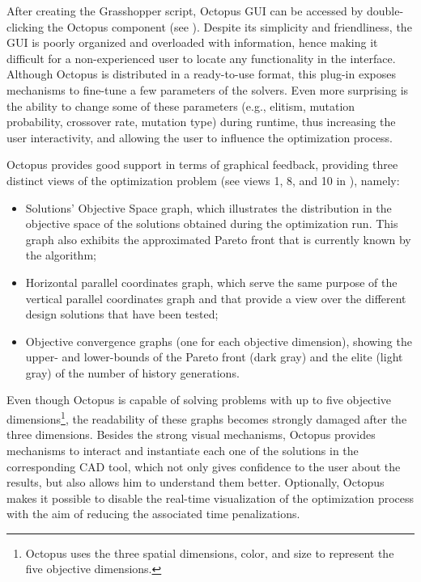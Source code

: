 	After creating the Grasshopper script, Octopus \ac{GUI} can be accessed by double-clicking the Octopus component (see ). Despite its simplicity and friendliness, the \ac{GUI} is poorly organized and overloaded with information, hence making it difficult for a non-experienced user to locate any functionality in the interface. Although Octopus is distributed in a ready-to-use format, this plug-in exposes mechanisms to fine-tune a few parameters of the solvers. Even more surprising is the ability to change some of these parameters (e.g., elitism, mutation probability, crossover rate, mutation type) during runtime, thus increasing the user interactivity, and allowing the user to influence the optimization process.
	
	Octopus provides good support in terms of graphical feedback, providing three distinct views of the optimization problem (see views 1, 8, and 10 in ), namely:
	\begin{itemize}
		\item Solutions' Objective Space graph, which illustrates the distribution in the objective space of the solutions obtained during the optimization run. This graph also exhibits the approximated Pareto front that is currently known by the algorithm;
		\item Horizontal parallel coordinates graph, which serve the same purpose of the vertical parallel coordinates graph and that provide a view over the different design solutions that have been tested;
		\item Objective convergence graphs (one for each objective dimension), showing the upper- and lower-bounds of the Pareto front (dark gray) and the elite (light gray) of the number of history generations.
	\end{itemize} 
	
	Even though Octopus is capable of solving problems with up to five objective dimensions\footnote{Octopus uses the three spatial dimensions, color, and size to represent the five objective dimensions.}, the readability of these graphs becomes strongly damaged after the three dimensions. Besides the strong visual mechanisms, Octopus provides mechanisms to interact and instantiate each one of the solutions in the corresponding \ac{CAD} tool, which not only gives confidence to the user about the results, but also allows him to understand them better. Optionally, Octopus makes it possible to disable the real-time visualization of the optimization process with the aim of reducing the associated time penalizations.
	
